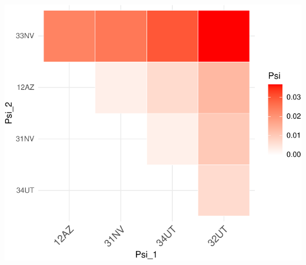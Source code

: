 \documentclass[]{article}
\begin{document}
\includegraphics{range_expansion_files/figure-latex/unnamed-chunk-4-1.pdf}
\end{document}
